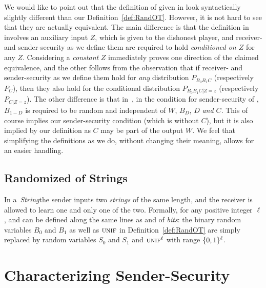 We would like to point out that the definition of \RandOT
given in \cite{CSSW06} look syntactically slightly different than
our Definition~\ref{def:RandOT}.
However, it is not hard to see that they are actually equivalent. The
main difference is that the definition in~\cite{CSSW06} involves
an auxiliary input $Z$, which is given to the dishonest player, and
receiver- and sender-security as we define them are required to hold
{\em conditioned on $Z$} for any $Z$. Considering a {\em constant} $Z$
immediately proves one direction of the claimed equivalence, and the
other follows from the observation that if receiver- and
sender-security as we define them hold for {\em any} distribution
$P_{B_0 B_1 C}$ (respectively $P_C$), then they also hold for the
conditional distribution $P_{B_0 B_1 C|Z=z}$ (respectively
$P_{C|Z=z}$). The other difference is that in~\cite{CSSW06}, in
the condition for sender-security of \RandOT, $B_{1-D}$ is required to
be random and independent of $W$, $B_D$, $D$ {\em and $C$}. This of
course implies our sender-security condition (which is without $C$), but
it is also implied by our definition as $C$ may be part of the output
$W$.  We feel that simplifying the definitions as we do, without
changing their meaning, allows for an easier handling.


\subsection{Randomized \OT of Strings}

In a \onetwo\,{\em String}\:\pOT the sender inputs two {\em strings}
of the same length, and the receiver is allowed to learn one and only
one of the two. Formally, for any positive integer $\ell$, \lStringOT
and \RandlStringOT can be defined along the same lines as \OT and
\RandOT of {\em bits}: the binary random variables $B_0$ and $B_1$ as
well as $\mbox{\sc unif}$ in Definition~\ref{def:RandOT} are simply replaced by
random variables $S_0$ and $S_1$ and $\mbox{\sc unif}^{\ell}$ with range
$\{0,1\}^{\ell}$.



\section{Characterizing Sender-Security}\label{sec:Main}


